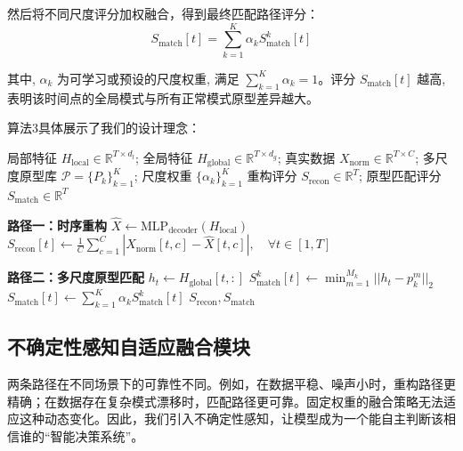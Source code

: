 \documentclass{setp-new}
\begin{document}
然后将不同尺度评分加权融合，得到最终匹配路径评分：
\begin{equation}
S_{\text{match}}[t] = \sum_{k=1}^{K} \alpha_k S_{\text{match}}^{k}[t]
\end{equation}

其中, $\alpha_k$ 为可学习或预设的尺度权重, 满足 $\sum_{k=1}^{K} \alpha_k = 1$。评分 $S_{\text{match}}[t]$ 越高, 表明该时间点的全局模式与所有正常模式原型差异越大。

算法3具体展示了我们的设计理念：
\begin{algorithm}[H]
\caption{双路径异常检测机制}
\label{alg:dual_path_detection}
\begin{algorithmic}[1]
\Require 局部特征 $H_{\text{local}} \in \mathbb{R}^{T \times d_l}$; 全局特征 $H_{\text{global}} \in \mathbb{R}^{T \times d_g}$; 真实数据 $X_{\text{norm}} \in \mathbb{R}^{T \times C}$; 多尺度原型库 $\mathcal{P} = \{P_k\}_{k=1}^K$; 尺度权重 $\{\alpha_k\}_{k=1}^K$
\Ensure 重构评分 $S_{\text{recon}} \in \mathbb{R}^{T}$; 原型匹配评分 $S_{\text{match}} \in \mathbb{R}^{T}$

\State \textbf{路径一：时序重构}
\State $\hat{X} \gets \text{MLP}_{\text{decoder}}(H_{\text{local}})$ 
\State $S_{\text{recon}}[t] \gets \frac{1}{C}\sum_{c=1}^C |X_{\text{norm}}[t, c] - \hat{X}[t, c]|, \quad \forall t \in [1, T]$ 

\State \textbf{路径二：多尺度原型匹配}
    \State $h_t \gets H_{\text{global}}[t, :]$ 
     
        \State $S^k_{\text{match}}[t] \gets \min_{m=1}^{M_k} ||h_t - p_k^m||_2$ 
    \EndFor
    \State $S_{\text{match}}[t] \gets \sum_{k=1}^K \alpha_k S^k_{\text{match}}[t]$ 
\EndFor
\State \Return $S_{\text{recon}}, S_{\text{match}}$
\end{algorithmic}
\end{algorithm}

\subsection{不确定性感知自适应融合模块}
两条路径在不同场景下的可靠性不同。例如，在数据平稳、噪声小时，重构路径更精确；在数据存在复杂模式漂移时，匹配路径更可靠。固定权重的融合策略无法适应这种动态变化。因此，我们引入不确定性感知，让模型成为一个能自主判断该相信谁的“智能决策系统”。
\end{document}
